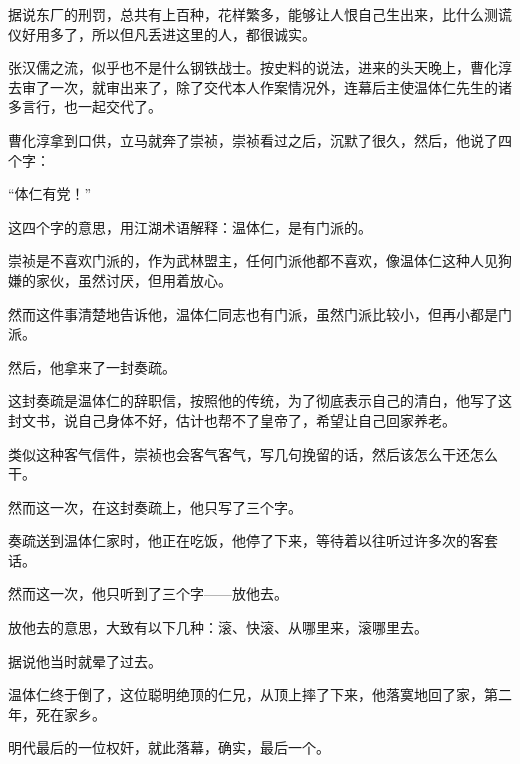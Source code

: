 \begin{multicols}{\theparacolNo}
据说东厂的刑罚，总共有上百种，花样繁多，能够让人恨自己生出来，比什么测谎仪好用多了，所以但凡丢进这里的人，都很诚实。

张汉儒之流，似乎也不是什么钢铁战士。按史料的说法，进来的头天晚上，曹化淳去审了一次，就审出来了，除了交代本人作案情况外，连幕后主使温体仁先生的诸多言行，也一起交代了。

曹化淳拿到口供，立马就奔了崇祯，崇祯看过之后，沉默了很久，然后，他说了四个字：

“体仁有党！”

这四个字的意思，用江湖术语解释：温体仁，是有门派的。

崇祯是不喜欢门派的，作为武林盟主，任何门派他都不喜欢，像温体仁这种人见狗嫌的家伙，虽然讨厌，但用着放心。

然而这件事清楚地告诉他，温体仁同志也有门派，虽然门派比较小，但再小都是门派。

然后，他拿来了一封奏疏。

这封奏疏是温体仁的辞职信，按照他的传统，为了彻底表示自己的清白，他写了这封文书，说自己身体不好，估计也帮不了皇帝了，希望让自己回家养老。

类似这种客气信件，崇祯也会客气客气，写几句挽留的话，然后该怎么干还怎么干。

然而这一次，在这封奏疏上，他只写了三个字。

奏疏送到温体仁家时，他正在吃饭，他停了下来，等待着以往听过许多次的客套话。

然而这一次，他只听到了三个字——放他去。

放他去的意思，大致有以下几种：滚、快滚、从哪里来，滚哪里去。

据说他当时就晕了过去。

温体仁终于倒了，这位聪明绝顶的仁兄，从顶上摔了下来，他落寞地回了家，第二年，死在家乡。

明代最后的一位权奸，就此落幕，确实，最后一个。
\ifnum{}
	\end{multicols}
\fi
\newpage
